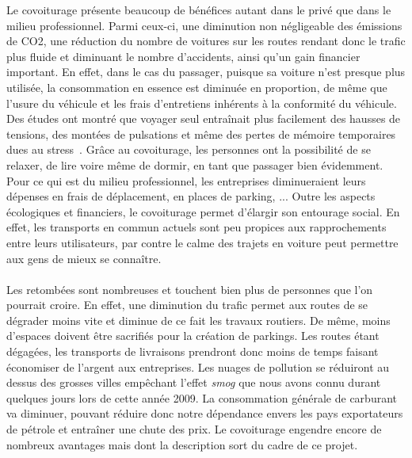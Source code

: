 \documentclass[12pt, a4paper, oneside]{article}
\begin{document}
    \indent Le covoiturage présente beaucoup de bénéfices autant dans le privé que dans le milieu professionnel. Parmi ceux-ci, une diminution non négligeable des émissions de CO2, une réduction du nombre de voitures sur les routes rendant donc le trafic plus fluide et diminuant le nombre d'accidents, ainsi qu'un gain financier important. En effet, dans le cas du passager, puisque sa voiture n'est presque plus utilisée, la consommation en essence est diminuée en proportion, de même que l'usure du véhicule et les frais d'entretiens inhérents à la conformité du véhicule. Des études ont montré que voyager seul entraînait plus facilement des hausses de tensions, des montées de pulsations et même des pertes de mémoire temporaires dues au stress~\cite{health-study}. Grâce au covoiturage, les personnes ont la possibilité de se relaxer, de lire voire même de dormir, en tant que passager bien évidemment. Pour ce qui est du milieu professionnel, les entreprises diminueraient leurs dépenses en frais de déplacement, en places de parking, ... Outre les aspects écologiques et financiers, le covoiturage permet d'élargir son entourage social. En effet, les transports en commun actuels sont peu propices aux rapprochements entre leurs utilisateurs, par contre le calme des trajets en voiture peut permettre aux gens de mieux se connaître.\\\\
    \indent Les retombées sont nombreuses et touchent bien plus de personnes que l'on pourrait croire. En effet, une diminution du trafic permet aux routes de se dégrader moins vite et diminue de ce fait les travaux routiers. De même, moins d'espaces doivent être sacrifiés pour la création de parkings. Les routes étant dégagées, les transports de livraisons prendront donc moins de temps faisant économiser de l'argent aux entreprises. Les nuages de pollution se réduiront au dessus des grosses villes empêchant l'effet \textit{smog} que nous avons connu durant quelques jours lors de cette année 2009. La consommation générale de carburant va diminuer, pouvant réduire donc notre dépendance envers les pays exportateurs de pétrole et entraîner une chute des prix. Le covoiturage engendre encore de nombreux avantages mais dont la description sort du cadre de ce projet.\\\\
\end{document}
